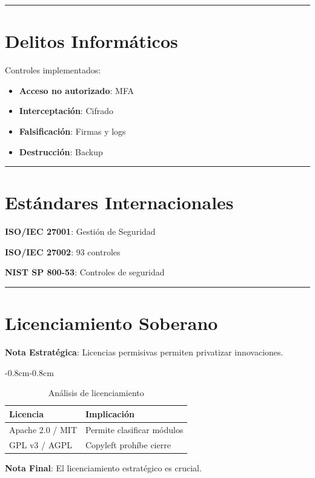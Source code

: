 \documentclass[11pt, spanish, letterpaper, twocolumn, openany]{book}
\newenvironment{tablacompleta}
{\begin{adjustwidth}{-0.8cm}{-0.8cm}}
{\end{adjustwidth}}
\newcommand{\separador}{
    \vspace{1.2ex}
    \begin{center}
        \color{sandraTeal}\rule{0.1\linewidth}{0.8pt}
    \end{center}
    \vspace{1.2ex}
}
\begin{document}
\separador

\section{Delitos Informáticos}

Controles implementados:
\begin{itemize}
    \item \textbf{Acceso no autorizado}: MFA
    \item \textbf{Interceptación}: Cifrado
    \item \textbf{Falsificación}: Firmas y logs
    \item \textbf{Destrucción}: Backup
\end{itemize}

\separador

\section{Estándares Internacionales}

\begin{estandarISO}
    \textbf{ISO/IEC 27001}: Gestión de Seguridad
\end{estandarISO}

\begin{estandarISO}
    \textbf{ISO/IEC 27002}: 93 controles
\end{estandarISO}

\begin{estandarISO}
    \textbf{NIST SP 800-53}: Controles de seguridad
\end{estandarISO}

\separador

\section{Licenciamiento Soberano}

\begin{alertaISO}
    \textbf{Nota Estratégica}: Licencias permisivas permiten privatizar innovaciones.
\end{alertaISO}

\begin{tablacompleta}
\begin{table}
    \centering
    \small
    \caption{Análisis de licenciamiento}
    \begin{tabular}{lp{7cm}}
        \toprule
        \textbf{Licencia} & \textbf{Implicación} \\
        \midrule
        Apache 2.0 / MIT & Permite clasificar módulos \\
        GPL v3 / AGPL & Copyleft prohíbe cierre \\
        \bottomrule
    \end{tabular}
\end{table}
\end{tablacompleta}

\begin{notaeditorial}
    \textbf{Nota Final}: El licenciamiento estratégico es crucial.
\end{notaeditorial}
\end{document}
